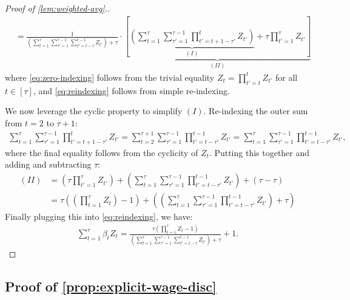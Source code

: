 \documentclass[12pt]{article}
\begin{document}
\begin{proof}[Proof of \cref{lem:weighted-avg}.]
\begin{align}
    &= \frac{1}{\left(\sum_{t=1}^\tau \sum_{\tau'=1}^{\tau-1}\sum_{t'=t-\tau}^{t-1}Z_{t'} \right) + \tau } \cdot \underbrace{\left[\underbrace{\left(\sum_{t=1}^\tau\sum_{\tau' = 1}^{\tau-1} \prod_{t'=t+1-\tau'}^{t}Z_{t'}\right)}_{(I)} +\tau \prod_{t'=1}^{\tau}Z_{t'}\right]}_{(II)} \label{eq:reindexing}
\end{align}
where \eqref{eq:zero-indexing} follows from the trivial equality $Z_t = \prod_{t'=t}^t Z_{t'}$ for all $t \in [\tau]$, and \eqref{eq:reindexing} follows from simple re-indexing.

We now leverage the cyclic property to simplify $(I)$. Re-indexing the outer sum from $t = 2$ to $\tau + 1$:
\begin{align*}
    \sum_{t=1}^\tau \sum_{\tau'=1}^{\tau-1}\prod_{t'=t+1-\tau'}^t Z_{t'} = \sum_{t=2}^{\tau+1}\sum_{\tau'=1}^{\tau-1}\prod_{t'=t-\tau'}^{t-1} Z_{t'} =  \sum_{t=1}^{\tau}\sum_{\tau'=1}^{\tau-1}\prod_{t'=t-\tau'}^{t-1} Z_{t'},
\end{align*}
where the final equality follows from the cyclicity of $Z_t$. Putting this together and adding and subtracting $\tau$:
\begin{align*}
    (II) &= \left(\tau \prod_{t'=1}^\tau Z_{t'}\right) +\left( \sum_{t=1}^\tau \sum_{\tau'=1}^{\tau-1}\prod_{t'=t-\tau'}^{t-1} Z_{t'}\right) + (\tau-\tau) \\
    &= \tau\left(\left(\prod_{t=1}^\tau Z_t\right) - 1\right) +\left( \left(\sum_{t=1}^\tau \sum_{\tau'=1}^{\tau-1}\prod_{t'=t-\tau'}^{t-1} Z_{t'}\right) + \tau\right)
\end{align*}
Finally plugging this into \eqref{eq:reindexing}, we have:
\begin{align*}
    \sum_{t=1}^\tau \beta_tZ_t = \frac{\tau\left(\prod_{t=1}^\tau Z_t - 1\right)}{\left(\sum_{t=1}^\tau \sum_{\tau'=1}^{\tau-1}\sum_{t'=t-\tau}^{t-1}Z_{t'} \right) + \tau } + 1.
\end{align*}
\end{proof}



\subsection{Proof of \cref{prop:explicit-wage-disc}}
\end{document}

